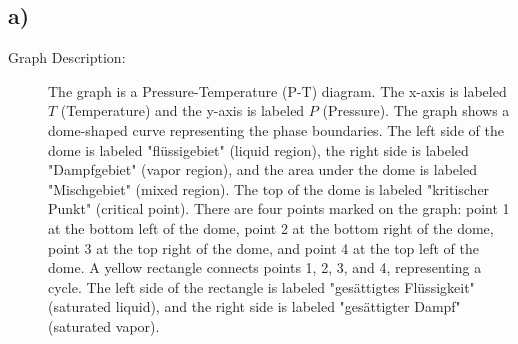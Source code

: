 

\subsection*{a)}

\begin{description}
    \item[Graph Description:] The graph is a Pressure-Temperature (P-T) diagram. The x-axis is labeled $T$ (Temperature) and the y-axis is labeled $P$ (Pressure). The graph shows a dome-shaped curve representing the phase boundaries. The left side of the dome is labeled "flüssigebiet" (liquid region), the right side is labeled "Dampfgebiet" (vapor region), and the area under the dome is labeled "Mischgebiet" (mixed region). The top of the dome is labeled "kritischer Punkt" (critical point). There are four points marked on the graph: point 1 at the bottom left of the dome, point 2 at the bottom right of the dome, point 3 at the top right of the dome, and point 4 at the top left of the dome. A yellow rectangle connects points 1, 2, 3, and 4, representing a cycle. The left side of the rectangle is labeled "gesättigtes Flüssigkeit" (saturated liquid), and the right side is labeled "gesättigter Dampf" (saturated vapor).
\end{description}